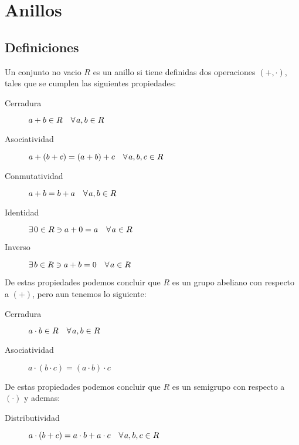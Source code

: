 
\newpage
\section{Anillos}


    \subsection{Definiciones}

        \begin{definicion}
            Un conjunto no vacio $R$ es un anillo si tiene definidas dos operaciones $(+, \cdot)$, tales que se cumplen las siguientes propiedades:

            \begin{description}
                \item[Cerradura] $a + b \in R \quad \forall \mkern2mu a, b \in R$
                \item[Asociatividad] $a + (b + c) = (a + b) + c \quad \forall \mkern2mu a, b, c \in R$
                \item[Conmutatividad] $a + b = b + a \quad \forall \mkern2mu a, b \in R$
                \item[Identidad] $\exists \mkern2mu 0 \in R \ni a + 0 = a \quad \forall \mkern2mu a \in R$
                \item[Inverso] $\exists \mkern2mu b \in R \ni a + b = 0 \quad \forall \mkern2mu a \in R$
            \end{description}

            De estas propiedades podemos concluir que $R$ es un grupo abeliano con respecto a $(+)$, pero aun tenemos lo siguiente:

            \begin{description}
                \item[Cerradura] $a \cdot b \in R \quad \forall \mkern2mu a, b \in R$
                \item[Asociatividad] $a \cdot (b \cdot c) = (a \cdot b) \cdot c$ 
            \end{description}

            De estas propiedades podemos concluir que $R$ es un semigrupo con respecto a $(\cdot)$ y ademas:

            \begin{description}
                \item[Distributividad] $a \cdot (b + c) = a \cdot b + a \cdot c \quad \forall \mkern2mu a, b, c \in R$
            \end{description}
        \end{definicion}

